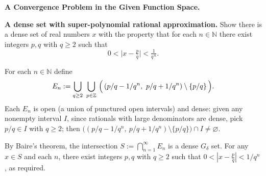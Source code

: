 \begin{problem}[CP-II-0542]
\label{prob:cp-ii-0542}
\textbf{A Convergence Problem in the Given Function Space.}

\par\hspace*{1.5em}\textbf{A dense set with super-polynomial rational approximation.}\quad
	Show there is a dense set of real numbers $x$ with the property that for each $n\in\mathbb N$
	there exist integers $p,q$ with $q\ge2$ such that
	\[
	0<\bigl|x-\tfrac{p}{q}\bigr|<\tfrac{1}{q^{\,n}}.
	\]
\end{problem}

\begin{solution}
For each $n\in\mathbb N$ define
	\[
	E_n:=\bigcup_{q\ge2}\ \bigcup_{p\in\mathbb Z}\ \Bigl(\,(p/q-1/q^n,\ p/q+1/q^n)\setminus\{p/q\}\,\Bigr).
	\]
	Each $E_n$ is open (a union of punctured open intervals) and dense: given any nonempty interval $I$,
	since rationals with large denominators are dense, pick $p/q\in I$ with $q\ge2$; then
	$\bigl((p/q-1/q^n,\ p/q+1/q^n)\setminus\{p/q\}\bigr)\cap I\ne\varnothing$.

	By Baire's theorem, the intersection $S:=\bigcap_{n=1}^\infty E_n$ is a dense $G_\delta$ set.
	For any $x\in S$ and each $n$, there exist integers $p,q$ with $q\ge2$ such that
	$0<|x-\tfrac{p}{q}|<1/q^n$, as required.
\end{solution}

